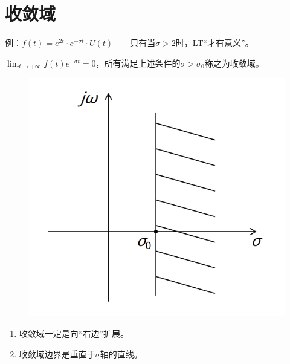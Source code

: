 \documentclass[UTF8]{ctexart}
\begin{document}
\section{收敛域}
例：$f(t)=e^{2t}\cdot{e^{-\sigma{t}}}\cdot{U(t)}\qquad$只有当$\sigma>2$时，LT“才有意义”。\par
$\lim_{t\rightarrow{+\infty}}f(t)e^{-\sigma{t}}=0$，所有满足上述条件的$\sigma>\sigma_0$称之为收敛域。
\begin{figure}[h]
      \centering
      \includegraphics[scale=0.35]{收敛域.png}
\end{figure}
\begin{enumerate}[label=(\arabic*),itemindent=0pt,labelindent=\parindent,labelwidth=2em,labelsep=5pt,leftmargin=*]
      \item 收敛域一定是向“右边”扩展。
      \item 收敛域边界是垂直于$\sigma$轴的直线。
\end{enumerate}\par

\newpage
\end{document}
